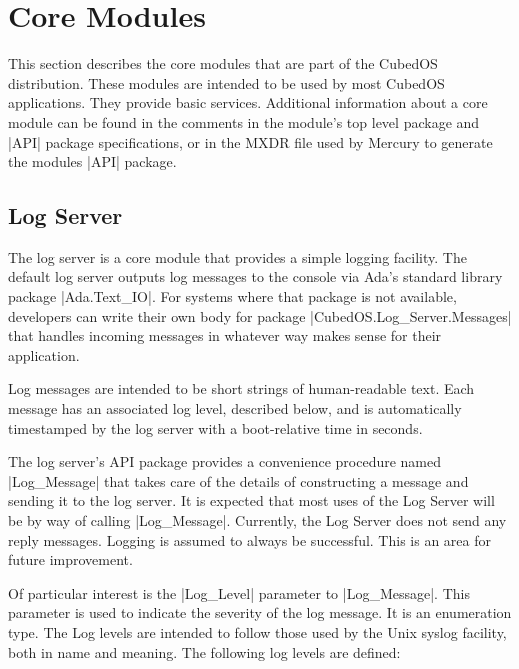 \section{Core Modules}
\label{sec:manual-core-modules}

This section describes the core modules that are part of the CubedOS distribution. These modules
are intended to be used by most CubedOS applications. They provide basic services. Additional
information about a core module can be found in the comments in the module's top level package
and |API| package specifications, or in the MXDR file used by Mercury to generate the modules
|API| package.

\subsection{Log Server}
\label{sec:manual-log-server}

The log server is a core module that provides a simple logging facility. The default log server
outputs log messages to the console via Ada's standard library package |Ada.Text_IO|. For
systems where that package is not available, developers can write their own body for package
|CubedOS.Log_Server.Messages| that handles incoming messages in whatever way makes sense for
their application.

Log messages are intended to be short strings of human-readable text. Each message has an
associated log level, described below, and is automatically timestamped by the log server with a
boot-relative time in seconds.

The log server's API package provides a convenience procedure named |Log_Message| that takes
care of the details of constructing a message and sending it to the log server. It is expected
that most uses of the Log Server will be by way of calling |Log_Message|. Currently, the Log
Server does not send any reply messages. Logging is assumed to always be successful. This is an
area for future improvement.

Of particular interest is the |Log_Level| parameter to |Log_Message|. This parameter is used to
indicate the severity of the log message. It is an enumeration type. The Log levels are intended
to follow those used by the Unix syslog facility, both in name and meaning. The following log
levels are defined:


